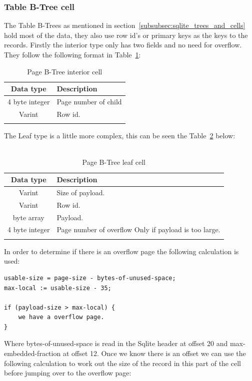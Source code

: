 \subsubsection{Table B-Tree cell}
\label{subsubsec:table_btree_cell}

The Table B-Trees as mentioned in section~\ref{subsubsec:sqlite_trees_and_cells} hold most of the data, they also use row id's or primary keys as the keys to the records. Firstly the interior type only has two fields and no need for overflow. They follow the following format in Table~\ref{tbl:table_btree_cell_interior}: 

\begin{longtable}[h]{| c | p{5cm} |}
		\hline
			\textbf{Data type} & \textbf{Description} \\ 
		\hline
		\endhead
			4 byte integer & Page number of child \\
		\hline
			Varint & Row id. \\
		\hline
	\caption{Page B-Tree interior cell}
	\label{tbl:table_btree_cell_interior}
\end{longtable}

The Leaf type is a little more complex, this can be seen the Table~\ref{tbl:table_btree_cell_leaf} below:
\\\\
\begin{longtable}[h]{| c | p{5cm} |}
		\hline
			\textbf{Data type} & \textbf{Description} \\ 
		\hline
		\endhead
			Varint & Size of payload. \\
		\hline
			Varint & Row id. \\
		\hline
			byte array & Payload. \\
		\hline
			4 byte integer & Page number of overflow \newline
							  Only if payload is too large.\\
		\hline
	\caption{Page B-Tree leaf cell}
	\label{tbl:table_btree_cell_leaf}
\end{longtable}

In order to determine if there is an overflow page the following calculation is used:

\begin{lstlisting}	
usable-size = page-size - bytes-of-unused-space;
max-local := usable-size - 35;

if (payload-size > max-local) {
	we have a overflow page.
}
\end{lstlisting}

Where bytes-of-unused-space is read in the Sqlite header at offset 20 and \newline max-embedded-fraction at offset 12. Once we know there is an offset we can use the following calculation to work out the size of the record in this part of the cell before jumping over to the overflow page:  

